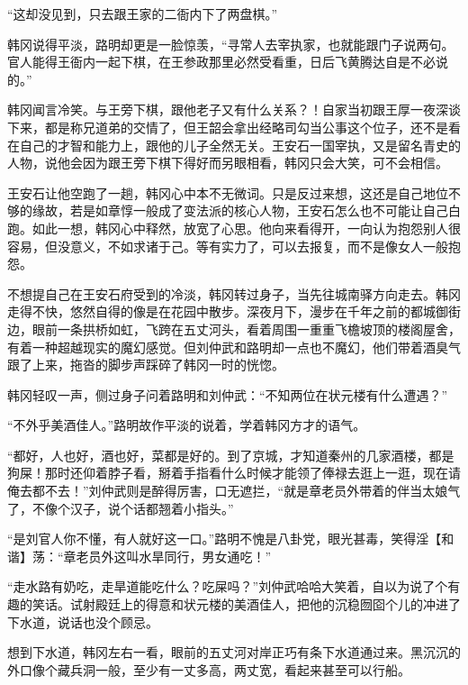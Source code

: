“这却没见到，只去跟王家的二衙内下了两盘棋。”

韩冈说得平淡，路明却更是一脸惊羡，“寻常人去宰执家，也就能跟门子说两句。官人能得王衙内一起下棋，在王参政那里必然受看重，日后飞黄腾达自是不必说的。”

韩冈闻言冷笑。与王旁下棋，跟他老子又有什么关系？！自家当初跟王厚一夜深谈下来，都是称兄道弟的交情了，但王韶会拿出经略司勾当公事这个位子，还不是看在自己的才智和能力上，跟他的儿子全然无关。王安石一国宰执，又是留名青史的人物，说他会因为跟王旁下棋下得好而另眼相看，韩冈只会大笑，可不会相信。

王安石让他空跑了一趟，韩冈心中本不无微词。只是反过来想，这还是自己地位不够的缘故，若是如章惇一般成了变法派的核心人物，王安石怎么也不可能让自己白跑。如此一想，韩冈心中释然，放宽了心思。他向来看得开，一向认为抱怨别人很容易，但没意义，不如求诸于己。等有实力了，可以去报复，而不是像女人一般抱怨。

不想提自己在王安石府受到的冷淡，韩冈转过身子，当先往城南驿方向走去。韩冈走得不快，悠然自得的像是在花园中散步。深夜月下，漫步在千年之前的都城御街边，眼前一条拱桥如虹，飞跨在五丈河头，看着周围一重重飞檐坡顶的楼阁屋舍，有着一种超越现实的魔幻感觉。但刘仲武和路明却一点也不魔幻，他们带着酒臭气跟了上来，拖沓的脚步声踩碎了韩冈一时的恍惚。

韩冈轻叹一声，侧过身子问着路明和刘仲武：“不知两位在状元楼有什么遭遇？”

“不外乎美酒佳人。”路明故作平淡的说着，学着韩冈方才的语气。

“都好，人也好，酒也好，菜都是好的。到了京城，才知道秦州的几家酒楼，都是狗屎！那时还仰着脖子看，掰着手指看什么时候才能领了俸禄去逛上一逛，现在请俺去都不去！”刘仲武则是醉得厉害，口无遮拦，“就是章老员外带着的伴当太娘气了，不像个汉子，说个话都翘着小指头。”

“是刘官人你不懂，有人就好这一口。”路明不愧是八卦党，眼光甚毒，笑得淫【和谐】荡：“章老员外这叫水旱同行，男女通吃！”

“走水路有奶吃，走旱道能吃什么？吃屎吗？”刘仲武哈哈大笑着，自以为说了个有趣的笑话。试射殿廷上的得意和状元楼的美酒佳人，把他的沉稳囫囵个儿的冲进了下水道，说话也没个顾忌。

想到下水道，韩冈左右一看，眼前的五丈河对岸正巧有条下水道通过来。黑沉沉的外口像个藏兵洞一般，至少有一丈多高，两丈宽，看起来甚至可以行船。

